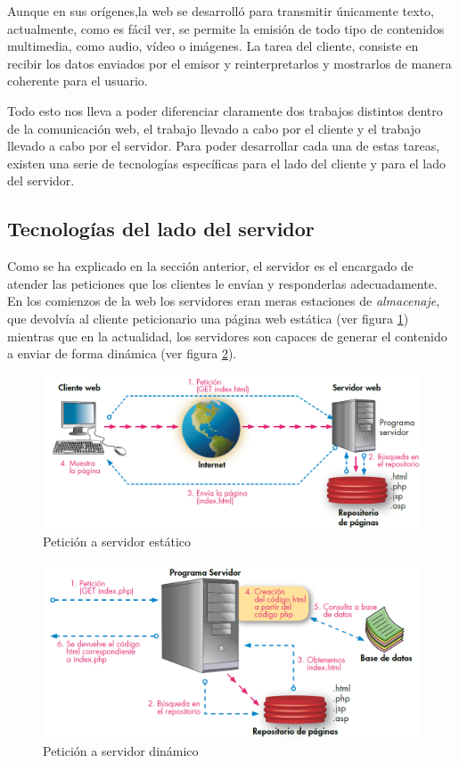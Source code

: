 Aunque en sus orígenes,la web se desarrolló para transmitir únicamente texto, actualmente, como es fácil ver, se permite la emisión de todo tipo de contenidos multimedia, como audio, vídeo o imágenes. La tarea del cliente, consiste en recibir los datos enviados por el emisor y reinterpretarlos y mostrarlos de manera coherente para el usuario.

Todo esto nos lleva a poder diferenciar claramente dos trabajos distintos dentro de la comunicación web, el trabajo llevado a cabo por el cliente y el trabajo llevado a cabo por el servidor. Para poder desarrollar cada una de estas tareas, existen una serie de tecnologías específicas para el lado del cliente y para el lado del servidor.

\subsection{Tecnologías del lado del servidor}
Como se ha explicado en la sección anterior, el servidor es el encargado de atender las peticiones que los clientes le envían y responderlas adecuadamente. 
En los comienzos de la web los servidores eran meras estaciones de \textit{almacenaje}, que devolvía al cliente peticionario una página web estática (ver figura \ref{fig:static-server}) mientras que en la actualidad, los servidores son capaces de generar el contenido a enviar de forma dinámica (ver figura \ref{fig:dynamic-server}).

\begin{figure}[hbtp]
\centering
\includegraphics[scale=0.5, fbox={\fboxrule} 4mm]{images/03-antecedentes/12-html_request.png}
\caption{Petición a servidor estático}
\label{fig:static-server}
\end{figure}

\begin{figure}[hbtp]
\centering
\includegraphics[scale=0.5, fbox={\fboxrule} 4mm]{images/03-antecedentes/13-html_dynamic_request.png}
\caption{Petición a servidor dinámico}
\label{fig:dynamic-server}
\end{figure}

